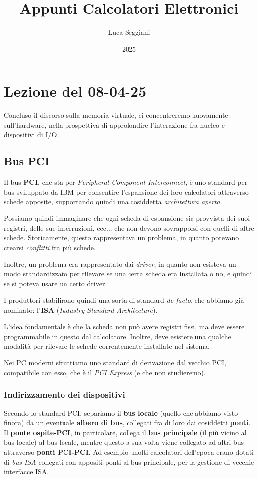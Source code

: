 \documentclass[a4paper,11pt]{article}
\title{Appunti Calcolatori Elettronici}
\author{Luca Seggiani}
\date{2025}
\begin{document}
\section{Lezione del 08-04-25}

\thispagestyle{empty}
\pagestyle{fancy}

Concluso il discorso sulla memoria virtuale, ci concentreremo nuovamente sull'hardware, nella prospettiva di approfondire l'interazione fra nucleo e dispositivi di I/O. 

\subsection{Bus PCI}
Il bus \textbf{PCI}, che sta per \textit{Peripheral Component Interconnect}, è uno standard per bus sviluppato da IBM per consentire l'espansione dei loro calcolatori attraverso schede apposite, supportando quindi una cosiddetta \textit{architettura aperta}.

Possiamo quindi immaginare che ogni scheda di espansione sia provvista dei suoi registri, delle sue interruzioni, ecc... che non devono sovrapporsi con quelli di altre schede.
Storicamente, questo rappresentava un problema, in quanto potevano crearsi \textit{conflitti} fra più schede.

Inoltre, un problema era rappresentato dai \textit{driver}, in quanto non esisteva un modo standardizzato per rilevare se una certa scheda era installata o no, e quindi se si poteva usare un certo driver.

I produttori stabilirono quindi una sorta di standard \textit{de facto}, che abbiamo già nominato: l'\textbf{ISA} (\textit{Industry Standard Architecture}).

L'idea fondamentale è che la scheda non può avere registri fissi, ma deve essere programmabile in questo dal calcolatore.
Inoltre, deve esistere una qualche modalità per rilevare le schede correntemente installate nel sistema.

Nei PC moderni sfruttiamo uno standard di derivazione dal vecchio PCI, compatibile con esso, che è il \textit{PCI Express} (e che non studieremo).

\subsubsection{Indirizzamento dei dispositivi}
Secondo lo standard PCI, separiamo il \textbf{bus locale} (quello che abbiamo visto finora) da un eventuale \textbf{albero di bus}, collegati fra di loro dai cosiddetti \textbf{ponti}.
Il \textbf{ponte ospite-PCI}, in particolare, collega il \textbf{bus principale} (il più vicino al bus locale) al bus locale, mentre questo a sua volta viene collegato ad altri bus attraverso \textbf{ponti PCI-PCI}.
Ad esempio, molti calcolatori dell'epoca erano dotati di \textit{bus ISA} collegati con appositi ponti al bus principale, per la gestione di vecchie interfacce ISA.
\end{document}
